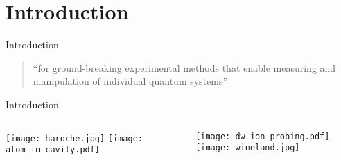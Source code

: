 \section{Introduction}

\begin{frame}{Introduction}
  \begin{minipage}[t][4.5cm][t]{\textwidth}


  \end{minipage}
  \vspace{.5cm}
  \begin{center}
    \begin{quote}
      ``for ground-breaking experimental methods that enable measuring and
      manipulation of individual quantum systems''
    \end{quote} 
  \end{center} 
\end{frame}

\begin{frame}[t]{Introduction}
  \begin{columns}[t]
    \begin{column}{0.5\textwidth}
      \begin{flushleft}
        \quad
        \texttt{[image: haroche.jpg]}
        \qquad
        \texttt{[image: atom\_in\_cavity.pdf]}
      \end{flushleft}
      \vspace{0.5cm}
    \end{column}
    ~
    \begin{column}{0.5\textwidth}
      \begin{flushright}
        \texttt{[image: dw\_ion\_probing.pdf]}
        \qquad
        \texttt{[image: wineland.jpg]}
      \end{flushright}
      \vspace{.5cm}
    \end{column}
  \end{columns}
\end{frame}

